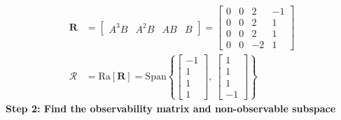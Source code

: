 \documentclass[twoside, 11pt, a4paper]{article}
\begin{document}
\begin{align*}
    \mathbf{R} &= \left[ \begin{array}{c|c|c|c} A^3 B & A^2 B & A B & B \end{array} \right] 
    =
    \left[ \begin{array}{cccc} 0 & 0 & 2 & -1 \\ 
    0 & 0 & 2 & 1 \\ 
    0 & 0 & 2 & 1 \\ 
    0 & 0 & -2 & 1 
    \end{array} \right] 
    \\
    \mathcal{R} &= \mathrm{Ra}[ \mathbf{R} ] = \mathrm{Span} \left\lbrace 
    \left[ \begin{array}{c} -1 \\  1 \\  1 \\  1  \end{array} \right] 
    , \
    \left[ \begin{array}{c} 1 \\  1 \\  1 \\  -1  \end{array} \right] 
    \right\rbrace
\end{align*}
%
\textbf{Step 2: Find the observability matrix and non-observable subspace}
%
%
\end{document}
